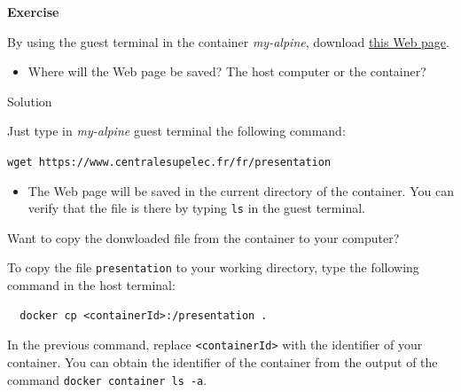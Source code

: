\documentclass[
]{article}
\providecommand{\tightlist}{%
  \setlength{\itemsep}{0pt}\setlength{\parskip}{0pt}}
\newenvironment{infobox}[1]
  {
  \begin{itemize}
  \renewcommand{\labelitemi}{
    \raisebox{-.7\height}[0pt][0pt]{
      
    }
  }
  \setlength{\fboxsep}{1em}
  \begin{whitebox}
  \item
  }
  {
  \end{whitebox}
  \end{itemize}
  }
\theoremstyle{definition}
\theoremstyle{definition}
\theoremstyle{definition}
\theoremstyle{remark}
\let\BeginKnitrBlock\begin \let\EndKnitrBlock\end
\begin{document}
\begin{infobox}{exercisebox}

\textbf{Exercise}

\BeginKnitrBlock{exercise}
\label{exr:wget-exo}{\label{exr:wget-exo} }By using the guest terminal
in the container \emph{my-alpine},
download
\href{https://www.centralesupelec.fr/fr/presentation}{this Web page}.

\begin{itemize}
\tightlist
\item
  Where will the Web page be saved? The host computer or the container?
\end{itemize}
\EndKnitrBlock{exercise}

\end{infobox}

Solution

\begin{infobox}{exercisebox}

Just type in \emph{my-alpine} guest terminal the following command:

\texttt{wget\ https://www.centralesupelec.fr/fr/presentation}

\begin{itemize}
\tightlist
\item
  The Web page will be saved in the current directory
  of the container. You can verify that the file is there
  by typing \texttt{ls} in the guest terminal.
\end{itemize}

\end{infobox}

Want to copy the donwloaded file from the container to your computer?

To copy the file \texttt{presentation} to your working directory, type the following command in
the host terminal:

\begin{verbatim}
  docker cp <containerId>:/presentation .
\end{verbatim}

In the previous command, replace \texttt{\textless{}containerId\textgreater{}} with the identifier of your container. You can obtain
the identifier of the container from the output of the command \texttt{docker\ container\ ls\ -a}.
\end{document}
